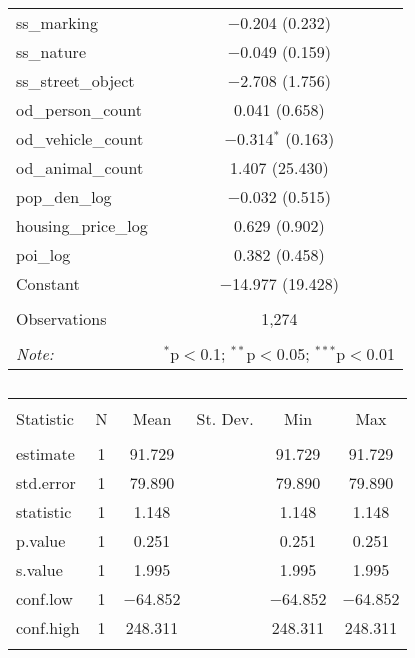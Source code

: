 \begin{table}[!htbp]
\begin{tabular}{@{\extracolsep{1pt}}lc}
  ss\_marking & $-$0.204 (0.232) \\ 
  ss\_nature & $-$0.049 (0.159) \\ 
  ss\_street\_object & $-$2.708 (1.756) \\ 
  od\_person\_count & 0.041 (0.658) \\ 
  od\_vehicle\_count & $-$0.314$^{*}$ (0.163) \\ 
  od\_animal\_count & 1.407 (25.430) \\ 
  pop\_den\_log & $-$0.032 (0.515) \\ 
  housing\_price\_log & 0.629 (0.902) \\ 
  poi\_log & 0.382 (0.458) \\ 
  Constant & $-$14.977 (19.428) \\ 
 \hline \\[-1.8ex] 
Observations & 1,274 \\ 
\hline 
\hline \\[-1.8ex] 
\textit{Note:}  & \multicolumn{1}{r}{$^{*}$p$<$0.1; $^{**}$p$<$0.05; $^{***}$p$<$0.01} \\ 
\end{tabular} 
\end{table} 

\begin{table}[!htbp] \centering 
  \caption{} 
  \label{} 
\small 
\begin{tabular}{@{\extracolsep{1pt}}lccccc} 
\\[-1.8ex]\hline 
\hline \\[-1.8ex] 
Statistic & \multicolumn{1}{c}{N} & \multicolumn{1}{c}{Mean} & \multicolumn{1}{c}{St. Dev.} & \multicolumn{1}{c}{Min} & \multicolumn{1}{c}{Max} \\ 
\hline \\[-1.8ex] 
estimate & 1 & 91.729 &  & 91.729 & 91.729 \\ 
std.error & 1 & 79.890 &  & 79.890 & 79.890 \\ 
statistic & 1 & 1.148 &  & 1.148 & 1.148 \\ 
p.value & 1 & 0.251 &  & 0.251 & 0.251 \\ 
s.value & 1 & 1.995 &  & 1.995 & 1.995 \\ 
conf.low & 1 & $-$64.852 &  & $-$64.852 & $-$64.852 \\ 
conf.high & 1 & 248.311 &  & 248.311 & 248.311 \\ 
\hline \\[-1.8ex] 
\end{tabular} 
\end{table} 

